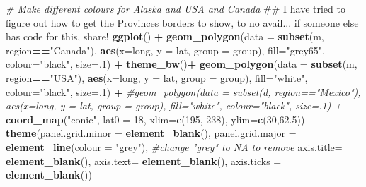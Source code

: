 \documentclass[]{book}
\newenvironment{Shaded}{\begin{snugshade}}{\end{snugshade}}
\newcommand{\KeywordTok}[1]{\textcolor[rgb]{0.13,0.29,0.53}{\textbf{#1}}}
\newcommand{\DataTypeTok}[1]{\textcolor[rgb]{0.13,0.29,0.53}{#1}}
\newcommand{\DecValTok}[1]{\textcolor[rgb]{0.00,0.00,0.81}{#1}}
\newcommand{\FloatTok}[1]{\textcolor[rgb]{0.00,0.00,0.81}{#1}}
\newcommand{\StringTok}[1]{\textcolor[rgb]{0.31,0.60,0.02}{#1}}
\newcommand{\CommentTok}[1]{\textcolor[rgb]{0.56,0.35,0.01}{\textit{#1}}}
\newcommand{\OperatorTok}[1]{\textcolor[rgb]{0.81,0.36,0.00}{\textbf{#1}}}
\newcommand{\NormalTok}[1]{#1}
\begin{document}
\begin{Shaded}
\begin{Highlighting}[]
\CommentTok{# Make different colours for Alaska and USA and Canada}
\NormalTok{## I have tried to figure out how to get the Provinces borders to show, to no avail... if someone else has code for this, share!}
\KeywordTok{ggplot}\NormalTok{() }\OperatorTok{+}\StringTok{ }
\StringTok{  }\KeywordTok{geom_polygon}\NormalTok{(}\DataTypeTok{data =} \KeywordTok{subset}\NormalTok{(m, region}\OperatorTok{==}\StringTok{"Canada"}\NormalTok{), }\KeywordTok{aes}\NormalTok{(}\DataTypeTok{x=}\NormalTok{long, }\DataTypeTok{y =}\NormalTok{ lat, }\DataTypeTok{group =}\NormalTok{ group), }\DataTypeTok{fill=}\StringTok{"grey65"}\NormalTok{, }\DataTypeTok{colour=}\StringTok{"black"}\NormalTok{, }\DataTypeTok{size=}\NormalTok{.}\DecValTok{1}\NormalTok{) }\OperatorTok{+}\StringTok{ }\KeywordTok{theme_bw}\NormalTok{()}\OperatorTok{+}
\StringTok{  }\KeywordTok{geom_polygon}\NormalTok{(}\DataTypeTok{data =} \KeywordTok{subset}\NormalTok{(m, region}\OperatorTok{==}\StringTok{"USA"}\NormalTok{), }\KeywordTok{aes}\NormalTok{(}\DataTypeTok{x=}\NormalTok{long, }\DataTypeTok{y =}\NormalTok{ lat, }\DataTypeTok{group =}\NormalTok{ group), }\DataTypeTok{fill=}\StringTok{"white"}\NormalTok{, }\DataTypeTok{colour=}\StringTok{"black"}\NormalTok{, }\DataTypeTok{size=}\NormalTok{.}\DecValTok{1}\NormalTok{) }\OperatorTok{+}
\StringTok{  }\CommentTok{#geom_polygon(data = subset(d, region=="Mexico"), aes(x=long, y = lat, group = group), fill="white", colour="black", size=.1) +}
\StringTok{  }\KeywordTok{coord_map}\NormalTok{(}\StringTok{"conic"}\NormalTok{, }\DataTypeTok{lat0 =} \DecValTok{18}\NormalTok{, }\DataTypeTok{xlim=}\KeywordTok{c}\NormalTok{(}\DecValTok{195}\NormalTok{, }\DecValTok{238}\NormalTok{), }\DataTypeTok{ylim=}\KeywordTok{c}\NormalTok{(}\DecValTok{30}\NormalTok{,}\FloatTok{62.5}\NormalTok{))}\OperatorTok{+}
\StringTok{  }\KeywordTok{theme}\NormalTok{(}\DataTypeTok{panel.grid.minor =} \KeywordTok{element_blank}\NormalTok{(),}
          \DataTypeTok{panel.grid.major =} \KeywordTok{element_line}\NormalTok{(}\DataTypeTok{colour =} \StringTok{"grey"}\NormalTok{),  }\CommentTok{#change "grey" to NA to remove}
          \DataTypeTok{axis.title=} \KeywordTok{element_blank}\NormalTok{(),}
          \DataTypeTok{axis.text=} \KeywordTok{element_blank}\NormalTok{(),     }
          \DataTypeTok{axis.ticks =} \KeywordTok{element_blank}\NormalTok{())}
\end{Highlighting}
\end{Shaded}
\end{document}

